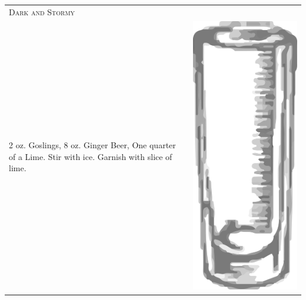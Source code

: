 \documentclass{article}
\begin{document}
\begin{tabular}{p{2in} p{0.5in}}
\multicolumn{2}{p{3in}}{\centering\Huge\textsc{Dark and Stormy}} \\ 
   \vspace{-0.1in}2 oz. Goslings, 8 oz. Ginger Beer, One quarter of a Lime. Stir with ice. Garnish with slice of lime. &
   \vspace{-0.1in} \includegraphics{collins.png}
\end{tabular}
\end{document}
